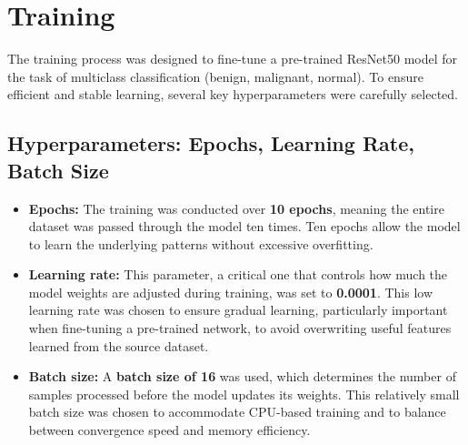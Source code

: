 
\section{Training}

The training process was designed to fine-tune a pre-trained ResNet50 model for the task of 
multiclass classification (benign, malignant, normal). To ensure efficient and stable learning, 
several key hyperparameters were carefully selected.


\subsection{Hyperparameters: Epochs, Learning Rate, Batch Size}

\begin{itemize}
    \item \textbf{Epochs:} The training was conducted over \textbf{10 epochs}, meaning the entire 
    dataset was passed through the model ten times. Ten epochs allow the model to learn the 
    underlying patterns without excessive overfitting.

    \item \textbf{Learning rate:} This parameter, a critical one that controls how much the model 
    weights are adjusted during training, was set to \textbf{0.0001}. This low learning rate was 
    chosen to ensure gradual learning, particularly important when fine-tuning a pre-trained 
    network, to avoid overwriting useful features learned from the source dataset.

    \item \textbf{Batch size:} A \textbf{batch size of 16} was used, which determines the number of 
    samples processed before the model updates its weights. This relatively small batch size was 
    chosen to accommodate CPU-based training and to balance between convergence speed and memory 
    efficiency.
\end{itemize}

